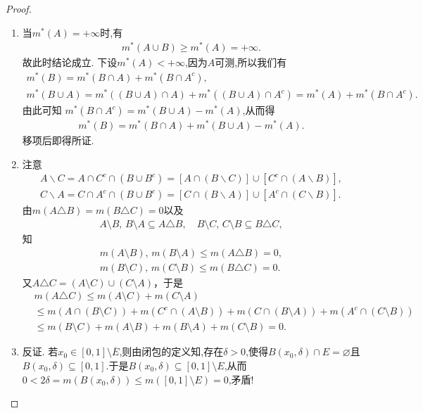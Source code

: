 \documentclass[../../main.tex]{subfiles}%
\begin{document}
\begin{proof}
\begin{enumerate}[(1)]
\item 当$m^*(A)=+\infty$时,有
\begin{align*}
m^*(A\cup B)\geqslant m^*(A)= +\infty. 
\end{align*}
故此时结论成立.
下设$m^*(A)<+\infty$,因为$A$可测,所以我们有
\begin{gather*}
m^*(B)=m^*(B\cap A)+m^*(B\cap A^c),
\\
m^*(B\cup A)=m^*((B\cup A)\cap A)+m^*((B\cup A)\cap A^c)
=m^*(A)+m^*(B\cap A^c).
\end{gather*}
由此可知 $m^*(B\cap A^c)=m^*(B\cup A)-m^*(A)$,从而得
\begin{align*}
m^*(B)=m^*(B\cap A)+m^*(B\cup A)-m^*(A).
\end{align*}
移项后即得所证.

\item 注意
\begin{gather*}
A\backslash C=A\cap C^c\cap \left( B\cup B^c \right) =\left[ A\cap \left( B\backslash C \right) \right] \cup \left[ C^c\cap \left( A\backslash B \right) \right] ,
\\
C\backslash A=C\cap A^c\cap \left( B\cup B^c \right) =\left[ C\cap \left( B\backslash A \right) \right] \cup \left[ A^c\cap \left( C\backslash B \right) \right] .
\end{gather*}
由$m(A\triangle B)=m(B\triangle C)=0$以及
\begin{align*}
A\setminus B,\,B\setminus A\subseteq A\triangle B,\quad B\setminus C,\,C\setminus B\subseteq B\triangle C,
\end{align*}
知
\begin{align*}
m(A\setminus B),\,m(B\setminus A)\leqslant m(A\triangle B)=0,\\
m(B\setminus C),\,m(C\setminus B)\leqslant m(B\triangle C)=0.
\end{align*}
又$A\triangle C=(A\setminus C)\cup (C\setminus A)$，于是
\begin{align*}
&m(A\triangle C)\leqslant m(A\setminus C)+m(C\setminus A)\\
&\leqslant m(A\cap (B\setminus C))+m(C^c\cap (A\setminus B))+m(C\cap (B\setminus A))+m(A^c\cap (C\setminus B))\\
&\leqslant m(B\setminus C)+m(A\setminus B)+m(B\setminus A)+m(C\setminus B)=0.
\end{align*}

\item 反证.
若$x_0\in [0,1]\setminus \overline{E}$,则由闭包的定义知,存在$\delta>0$,使得$B(x_0,\delta)\cap E=\varnothing$且$B(x_0,\delta)\subseteq [0,1]$.于是$B(x_0,\delta)\subseteq [0,1]\setminus E$,从而$0<2\delta=m(B(x_0,\delta))\leqslant m([0,1]\setminus E)=0$,矛盾!


\end{enumerate}
\end{proof}
\end{document}
